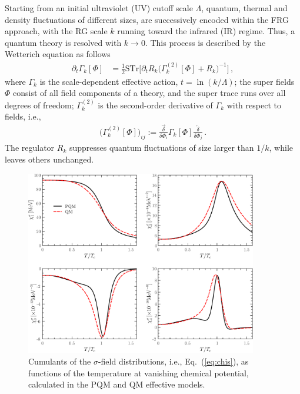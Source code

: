 \documentclass[final,5p,times,twocolumn,colorlinks=true,citecolor=blue,linkcolor=blue]{elsarticle}
\def\Eq#1{Eq.~(\ref{#1})}
\begin{document}
 
Starting from an initial ultraviolet (UV) cutoff scale $\Lambda$, quantum, thermal and density fluctuations of different sizes, are successively encoded  within the FRG approach, with the RG scale $k$ running toward the infrared (IR) regime. Thus, a quantum theory is resolved with $k\rightarrow 0$. This process is described by the Wetterich equation \cite{Wetterich:1992yh} as follows 
\begin{align}
  \partial_{t}\Gamma_{k}[\Phi]&=\frac{1}{2}\mathrm{STr}\Big[\partial_{t} R_{k}\big(\Gamma_{k}^{(2)}[\Phi]+R_{k}\big)^{-1}\Big]\,,
 \label{eq:WetterichEq}
\end{align}
where $\Gamma_{k}$ is the scale-dependent effective action, $t=\ln (k/\Lambda)$; the super fields $\Phi$ consist of all field components of a theory, and the super trace runs over all degrees of freedom; $\Gamma_{k}^{(2)}$ is the second-order derivative of $\Gamma_{k}$ with respect to fields, i.e.,
\begin{align}
 \big (\Gamma_{k}^{(2)}[\Phi]\big)_{ij}:=\frac{\overrightarrow{\delta}}{\delta\Phi_i}\Gamma_{k}[\Phi]\frac{\overleftarrow{\delta}}{\delta\Phi_j}\,.
 \label{eq:Gamma2}
\end{align}
The regulator $R_{k}$ suppresses quantum fluctuations of size larger than $1/k$, while leaves others unchanged. 

%
\begin{figure}[t]
\includegraphics[width=0.9\textwidth]{chis}
\caption{Cumulants of the $\sigma$-field distributions, i.e., \Eq{eq:chis}, as functions of the temperature at vanishing chemical potential, calculated in the PQM and QM effective models.}\label{fig:chis}
\end{figure}
%
\end{document}
